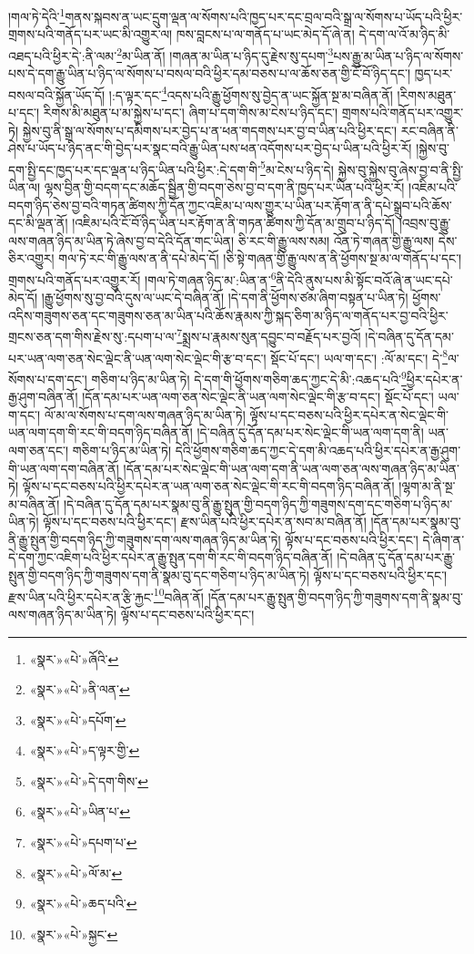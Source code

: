 །གལ་ཏེ་དེའི་\footnote{«སྣར་»«པེ་»ཞོའི་}གནས་སྐབས་ན་ཡང་དྲུག་ལྡན་ལ་སོགས་པའི་ཁྱད་པར་དང་བྲལ་བའི་སྒྲ་ལ་སོགས་པ་ཡོད་པའི་ཕྱིར་གྲགས་པའི་གནོད་པར་ཡང་མི་འགྱུར་ལ། ཁས་བླངས་པ་ལ་གནོད་པ་ཡང་མེད་དོ་ཞེ་ན། དེ་དག་ལ་འོ་མ་ཉིད་མི་འཐད་པའི་ཕྱིར་དེ་:ནི་ལམ་\footnote{«སྣར་»«པེ་»ནི་ལན་}མ་ཡིན་ནོ། །གཞན་མ་ཡིན་པ་ཉིད་དུ་རྗེས་སུ་དཔག་\footnote{«སྣར་»«པེ་»དཔོག་}པས་རྒྱུ་མ་ཡིན་པ་ཉིད་ལ་སོགས་པས་དེ་དག་རྒྱུ་ཡིན་པ་ཉིད་ལ་སོགས་པ་བསལ་བའི་ཕྱིར་དམ་བཅས་པ་ལ་ཆོས་ཅན་གྱི་ངོ་བོ་ཉིད་དང་། ཁྱད་པར་བསལ་བའི་སྐྱོན་ཡོད་དོ། །:ད་ལྟར་དང་\footnote{«སྣར་»«པེ་»ད་ལྟར་གྱི་}འདས་པའི་རྒྱུ་ཕྱོགས་སུ་བྱེད་ན་ཡང་སྐྱོན་སྔ་མ་བཞིན་ནོ། །རིགས་མཐུན་པ་དང་། རིགས་མི་མཐུན་པ་མ་སྐྱེས་པ་དང་། ཞིག་པ་དག་གིས་མ་ངེས་པ་ཉིད་དང་། གྲགས་པའི་གནོད་པར་འགྱུར་ཏེ། སྐྱེས་བུ་ནི་སྒྲ་ལ་སོགས་པ་དམིགས་པར་བྱེད་པ་ན་ཕན་གདགས་པར་བྱ་བ་ཡིན་པའི་ཕྱིར་དང་། རང་བཞིན་ནི་ཤེས་པ་ཡོད་པ་ཉིད་ནང་གི་བྱེད་པར་སྣང་བའི་རྒྱུ་ཡིན་པས་ཕན་འདོགས་པར་བྱེད་པ་ཡིན་པའི་ཕྱིར་རོ། །སྐྱེས་བུ་དག་སྤྱི་དང་ཁྱད་པར་དང་ལྡན་པ་ཉིད་ཡིན་པའི་ཕྱིར་:དེ་དག་གི་\footnote{«སྣར་»«པེ་»དེ་དག་གིས་}མ་ངེས་པ་ཉིད་དེ། སྐྱེས་བུ་སྐྱེས་བུ་ཞེས་བྱ་བ་ནི་སྤྱི་ཡིན་ལ། ལྷས་བྱིན་གྱི་བདག་དང་མཆོད་སྦྱིན་གྱི་བདག་ཅེས་བྱ་བ་དག་ནི་ཁྱད་པར་ཡིན་པའི་ཕྱིར་རོ། །འཇིམ་པའི་བདག་ཉིད་ཅེས་བྱ་བའི་གཏན་ཚིགས་ཀྱི་དོན་ཀྱང་འཇིམ་པ་ལས་གྱུར་པ་ཡིན་པར་རྟོག་ན་ནི་དཔེ་སྒྲུབ་པའི་ཆོས་དང་མི་ལྡན་ནོ། །འཇིམ་པའི་ངོ་བོ་ཉིད་ཡིན་པར་རྟོག་ན་ནི་གཏན་ཚིགས་ཀྱི་དོན་མ་གྲུབ་པ་ཉིད་དོ། །འབྲས་བུ་རྒྱུ་ལས་གཞན་ཉིད་མ་ཡིན་ཏེ་ཞེས་བྱ་བ་དེའི་དོན་གང་ཡིན། ཅི་རང་གི་རྒྱུ་ལས་སམ། འོན་ཏེ་གཞན་གྱི་རྒྱུ་ལས། དེས་ཅིར་འགྱུར། གལ་ཏེ་རང་གི་རྒྱུ་ལས་ན་ནི་དཔེ་མེད་དོ། །ཅི་སྟེ་གཞན་གྱི་རྒྱུ་ལས་ན་ནི་ཕྱོགས་སྔ་མ་ལ་གནོད་པ་དང་། གྲགས་པའི་གནོད་པར་འགྱུར་རོ། །གལ་ཏེ་གཞན་ཉིད་མ་:ཡིན་ན་\footnote{«སྣར་»«པེ་»ཡིན་པ་}ནི་དེའི་ནུས་པས་མི་སྟོང་བའོ་ཞེ་ན་ཡང་དཔེ་མེད་དོ། །རྒྱུ་ཕྱོགས་སུ་བྱ་བའི་དུས་ལ་ཡང་དེ་བཞིན་ནོ། །དེ་དག་ནི་ཕྱོགས་ཙམ་ཞིག་བསྟན་པ་ཡིན་ཏེ། ཕྱོགས་འདིས་གཟུགས་ཅན་དང་གཟུགས་ཅན་མ་ཡིན་པའི་ཆོས་རྣམས་ཀྱི་སྐད་ཅིག་མ་ཉིད་ལ་གནོད་པར་བྱ་བའི་ཕྱིར་གྲངས་ཅན་དག་གིས་རྗེས་སུ་:དཔག་པ་ལ་\footnote{«སྣར་»«པེ་»དཔག་པ་}སྨྲས་པ་རྣམས་སུན་དབྱུང་བ་བརྗོད་པར་བྱའོ། །དེ་བཞིན་དུ་དོན་དམ་པར་ཡན་ལག་ཅན་སེང་ལྡེང་ནི་ཡན་ལག་སེང་ལྡེང་གི་རྩ་བ་དང་། སྡོང་པོ་དང་། ཡལ་ག་དང་། :ལོ་མ་དང་། དེ་\footnote{«སྣར་»«པེ་»ལོ་མ་}ལ་སོགས་པ་དག་དང་། གཅིག་པ་ཉིད་མ་ཡིན་ཏེ། དེ་དག་གི་ཕྱོགས་གཅིག་ཆད་ཀྱང་དེ་མི་:འཆད་པའི་\footnote{«སྣར་»«པེ་»ཆད་པའི་}ཕྱིར་དཔེར་ན་རྒྱ་ཤུག་བཞིན་ནོ། །དོན་དམ་པར་ཡན་ལག་ཅན་སེང་ལྡེང་ནི་ཡན་ལག་སེང་ལྡེང་གི་རྩ་བ་དང་། སྡོང་པོ་དང་། ཡལ་ག་དང་། ལོ་མ་ལ་སོགས་པ་དག་ལས་གཞན་ཉིད་མ་ཡིན་ཏེ། ལྟོས་པ་དང་བཅས་པའི་ཕྱིར་དཔེར་ན་སེང་ལྡེང་གི་ཡན་ལག་དག་གི་རང་གི་བདག་ཉིད་བཞིན་ནོ། །དེ་བཞིན་དུ་དོན་དམ་པར་སེང་ལྡེང་གི་ཡན་ལག་དག་ནི། ཡན་ལག་ཅན་དང་། གཅིག་པ་ཉིད་མ་ཡིན་ཏེ། དེའི་ཕྱོགས་གཅིག་ཆད་ཀྱང་དེ་དག་མི་འཆད་པའི་ཕྱིར་དཔེར་ན་རྒྱ་ཤུག་གི་ཡན་ལག་དག་བཞིན་ནོ། །དོན་དམ་པར་སེང་ལྡེང་གི་ཡན་ལག་དག་ནི་ཡན་ལག་ཅན་ལས་གཞན་ཉིད་མ་ཡིན་ཏེ། ལྟོས་པ་དང་བཅས་པའི་ཕྱིར་དཔེར་ན་ཡན་ལག་ཅན་སེང་ལྡེང་གི་རང་གི་བདག་ཉིད་བཞིན་ནོ། །ལྷག་མ་ནི་སྔ་མ་བཞིན་ནོ། །དེ་བཞིན་དུ་དོན་དམ་པར་སྣམ་བུ་ནི་རྒྱུ་སྤུན་གྱི་བདག་ཉིད་ཀྱི་གཟུགས་དག་དང་གཅིག་པ་ཉིད་མ་ཡིན་ཏེ། ལྟོས་པ་དང་བཅས་པའི་ཕྱིར་དང་། རྫས་ཡིན་པའི་ཕྱིར་དཔེར་ན་སབ་མ་བཞིན་ནོ། །དོན་དམ་པར་སྣམ་བུ་ནི་རྒྱུ་སྤུན་གྱི་བདག་ཉིད་ཀྱི་གཟུགས་དག་ལས་གཞན་ཉིད་མ་ཡིན་ཏེ། ལྟོས་པ་དང་བཅས་པའི་ཕྱིར་དང་། དེ་ཞིག་ན་དེ་དག་ཀྱང་འཇིག་པའི་ཕྱིར་དཔེར་ན་རྒྱུ་སྤུན་དག་གི་རང་གི་བདག་ཉིད་བཞིན་ནོ། །དེ་བཞིན་དུ་དོན་དམ་པར་རྒྱུ་སྤུན་གྱི་བདག་ཉིད་ཀྱི་གཟུགས་དག་ནི་སྣམ་བུ་དང་གཅིག་པ་ཉིད་མ་ཡིན་ཏེ། ལྟོས་པ་དང་བཅས་པའི་ཕྱིར་དང་། རྫས་ཡིན་པའི་ཕྱིར་དཔེར་ན་རྩི་རྐྱང་\footnote{«སྣར་»«པེ་»སྐྱང་}བཞིན་ནོ། །དོན་དམ་པར་རྒྱུ་སྤུན་གྱི་བདག་ཉིད་ཀྱི་གཟུགས་དག་ནི་སྣམ་བུ་ལས་གཞན་ཉིད་མ་ཡིན་ཏེ། ལྟོས་པ་དང་བཅས་པའི་ཕྱིར་དང་། 